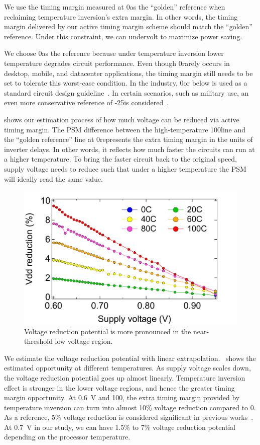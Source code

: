 We use the timing margin measured at 0\C as the ``golden'' reference when reclaiming temperature inversion's extra margin. In other words, the timing margin delivered by our active timing margin scheme should match the ``golden'' reference. Under this constraint, we can undervolt to maximize power saving. 

We choose 0\C as the reference because under temperature inversion lower temperature degrades circuit performance. Even though 0\C rarely occurs in desktop, mobile, and datacenter applications, the timing margin still needs to be set to tolerate this worst-case condition. In the industry, 0\C or below is used as a standard circuit design guideline~\cite{altera2010timing}. In certain scenarios, such as military use, an even more conservative reference of -25\C is considered~\cite{dasdan2006handling}.

 shows our estimation process of how much voltage can be reduced via active timing margin. The PSM difference between the high-temperature 100\C line and the ``golden reference'' line at 0\C represents the extra timing margin in the units of inverter delays. In other words, it reflects how much faster the circuits can run at a higher temperature. To bring the faster circuit back to the original speed, supply voltage needs to reduce such that under a higher temperature the PSM will ideally read the same value.

\begin{figure}
  \centering
  \includegraphics[trim=0 0 50 20,clip,width=.8\linewidth]{graphs/temperature/extrapolate-uv-potential.pdf}
  \caption{Voltage reduction potential is more pronounced in the near-threshold low voltage region.}
  \label{fig:uv-potential} 
\end{figure}

We estimate the voltage reduction potential with linear extrapolation.~ shows the estimated opportunity at different temperatures. As supply voltage scales down, the voltage reduction potential goes up almost linearly. Temperature inversion effect is stronger in the lower voltage regions, and hence the greater timing margin opportunity. At 0.6~V and 100\C, the extra timing margin provided by temperature inversion can turn into almost 10\% voltage reduction compared to 0\C. As a reference, 5\% voltage reduction is considered significant in previous works~\cite{webel2015robust}. At 0.7~V in our study, we can have 1.5\% to 7\% voltage reduction potential depending on the processor temperature.


